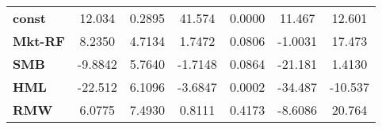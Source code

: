 \begin{center}
\begin{tabular}{lcccccc}
\midrule
\textbf{const}  &       12.034       &       0.2895       &      41.574     &      0.0000      &       11.467      &       12.601       \\
\textbf{Mkt-RF} &       8.2350       &       4.7134       &      1.7472     &      0.0806      &      -1.0031      &       17.473       \\
\textbf{SMB}    &      -9.8842       &       5.7640       &     -1.7148     &      0.0864      &      -21.181      &       1.4130       \\
\textbf{HML}    &      -22.512       &       6.1096       &     -3.6847     &      0.0002      &      -34.487      &      -10.537       \\
\textbf{RMW}    &       6.0775       &       7.4930       &      0.8111     &      0.4173      &      -8.6086      &       20.764       \\
\bottomrule
\end{tabular}
\end{center}
